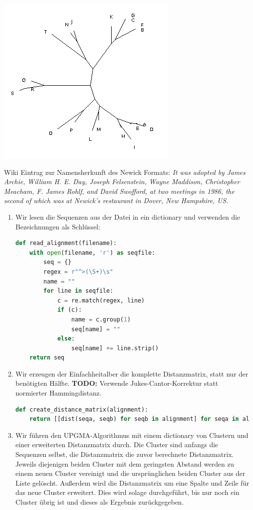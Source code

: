 \documentclass{homework}
\begin{document}
\begin{enumerate}
	\includegraphics[scale=0.4]{u3_aufg2_max_parsimony.png} 

Wiki Eintrag zur Namensherkunft des Newick Formats: \textit{It was adopted by James Archie, William H. E. Day, Joseph Felsenstein, Wayne Maddison, Christopher Meacham, F. James Rohlf, and David Swofford, at two meetings in 1986, the second of which was at Newick's restaurant in Dover, New Hampshire, US.}

\begin{enumerate}
\item Wir lesen die Sequenzen aus der Datei in ein dictionary und verwenden die
Bezeichnungen als Schlüssel:

\begin{lstlisting}[language=python]
def read_alignment(filename):
	with open(filename, 'r') as seqfile:
		seq = {}
		regex = r"^>(\S+)\s"
		name = ""
		for line in seqfile:
			c = re.match(regex, line)
			if (c):
				name = c.group(1)
				seq[name] = ""
			else:
				seq[name] += line.strip()
	return seq
\end{lstlisting}

\item Wir erzeugen der Einfachheitalber die komplette Distanzmatrix, statt nur
der benötigten Hälfte. \textbf{TODO:} Verwende Jukes-Cantor-Korrektur statt
normierter Hammingdistanz.

\begin{lstlisting}[language=python]
def create_distance_matrix(alignment):
	return [[dist(seqa, seqb) for seqb in alignment] for seqa in alignment]
\end{lstlisting}

\item Wir führen den UPGMA-Algorithmus mit einem dictionary von Clustern und
einer erweiterten Distanzmatrix durch. Die Cluster sind anfangs die Sequenzen
selbst, die Distanzmatrix die zuvor berechnete Distanzmatrix. Jeweils diejenigen
beiden Cluster mit dem geringsten Abstand werden zu einem neuen Cluster
vereinigt und die ursprünglichen beiden Cluster aus der Liste gelöscht.
Außerdem wird die Distanzmatrix um eine Spalte und Zeile für das neue Cluster
erweitert. Dies wird solage durchgeführt, bis nur noch ein Cluster übrig ist und
dieses als Ergebnis zurückgegeben.


\end{enumerate}
\end{enumerate}
\end{document}
